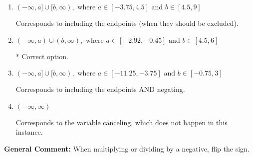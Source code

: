 \documentclass{extbook}[14pt]
\begin{document}
\begin{enumerate}
{\begin{enumerate}[label=\Alph*.]
Corresponds to inverting the inequality and negating the solution.
\item \( (-\infty, a] \cup [b, \infty), \text{ where } a \in [-3.75, 4.5] \text{ and } b \in [4.5, 9] \)

Corresponds to including the endpoints (when they should be excluded).
\item \( (-\infty, a) \cup (b, \infty), \text{ where } a \in [-2.92, -0.45] \text{ and } b \in [4.5, 6] \)

 * Correct option.
\item \( (-\infty, a] \cup [b, \infty), \text{ where } a \in [-11.25, -3.75] \text{ and } b \in [-0.75, 3] \)

Corresponds to including the endpoints AND negating.
\item \( (-\infty, \infty) \)

Corresponds to the variable canceling, which does not happen in this instance.
\end{enumerate}

\textbf{General Comment:} When multiplying or dividing by a negative, flip the sign.
}
\end{enumerate}
\end{document}
